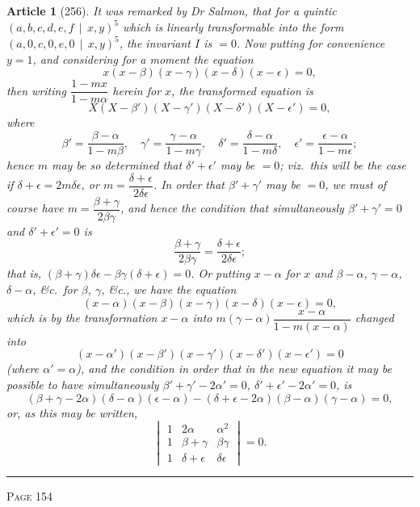 \documentclass[11pt,a4paper]{article}
\theoremstyle{cayley}
\newtheorem{art}{Article}
\begin{document}
\begin{art}[256]
It was remarked by Dr Salmon, that for a quintic $(a, b, c, d, e, f \,\mid\, x, y)^5$ which is linearly transformable into the form $(a, 0, c, 0, e, 0 \,\mid\, x, y)^5$, the invariant $I$ is $=0$. Now putting for convenience $y=1$, and considering for a moment the equation
\[
x(x-\beta)(x-\gamma)(x-\delta)(x-\epsilon) = 0,
\]
then writing $\dfrac{1-mx}{1-m\alpha}$ herein for $x$, the transformed equation is
\[
X(X-\beta')(X-\gamma')(X-\delta')(X-\epsilon') = 0,
\]
where
\[
\beta' = \frac{\beta - \alpha}{1-m\beta}, \quad \gamma' = \frac{\gamma - \alpha}{1-m\gamma}, \quad \delta' = \frac{\delta - \alpha}{1-m\delta}, \quad \epsilon' = \frac{\epsilon - \alpha}{1-m\epsilon};
\]
hence $m$ may be so determined that $\delta'+\epsilon'$ may be $=0$; viz.\ this will be the case if $\delta+\epsilon = 2m\delta\epsilon$, or $m = \dfrac{\delta+\epsilon}{2\delta\epsilon}$. In order that $\beta'+\gamma'$ may be $=0$, we must of course have $m = \dfrac{\beta+\gamma}{2\beta\gamma}$, and hence the condition that simultaneously $\beta'+\gamma'=0$ and $\delta'+\epsilon'=0$ is
\[
\frac{\beta+\gamma}{2\beta\gamma} = \frac{\delta+\epsilon}{2\delta\epsilon};
\]
that is, $(\beta+\gamma)\delta\epsilon - \beta\gamma(\delta+\epsilon) = 0$. Or putting $x-\alpha$ for $x$ and $\beta-\alpha$, $\gamma-\alpha$, $\delta-\alpha$, \&c.\ for $\beta$, $\gamma$, \&c., we have the equation
\[
(x-\alpha)(x-\beta)(x-\gamma)(x-\delta)(x-\epsilon) = 0,
\]
which is by the transformation $x-\alpha$ into $m(\gamma-\alpha)\dfrac{x-\alpha}{1-m(x-\alpha)}$ changed into
\[
(x-\alpha')(x-\beta')(x-\gamma')(x-\delta')(x-\epsilon') = 0
\]
(where $\alpha'=\alpha$), and the condition in order that in the new equation it may be possible to have simultaneously $\beta'+\gamma'-2\alpha'=0$, $\delta'+\epsilon'-2\alpha'=0$, is
\[
(\beta+\gamma-2\alpha)(\delta-\alpha)(\epsilon-\alpha) - (\delta+\epsilon-2\alpha)(\beta-\alpha)(\gamma-\alpha) = 0,
\]
or, as this may be written,
\[
\begin{vmatrix}
1 & 2\alpha & \alpha^2 \\
1 & \beta+\gamma & \beta\gamma \\
1 & \delta+\epsilon & \delta\epsilon
\end{vmatrix} = 0.
\]
\end{art}

\vspace{1em}
\noindent\rule{\textwidth}{0.4pt}
\begin{center}\textsc{Page 154}\end{center}
\newpage
\end{document}

